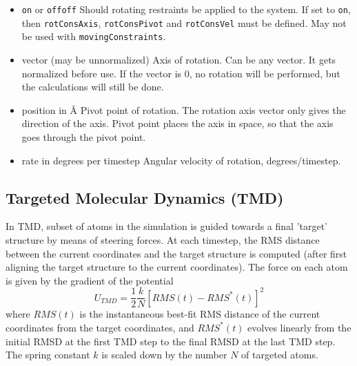 \begin{itemize}

\item
{}
{{\tt on} or {\tt off}}{{\tt off}}
{Should rotating restraints be applied to the system. If set
to {\tt on}, then {\tt rotConsAxis}, {\tt rotConsPivot} and
{\tt rotConsVel} must be defined.
May not be used with {\tt movingConstraints}.}

\item
{}
{vector (may be unnormalized)}
{Axis of rotation. Can be any vector. It gets
normalized before use. If the vector is 0,
no rotation will be performed, but the calculations
will still be done.}

\item
{}
{position in \AA}
{Pivot point of rotation. The rotation axis vector
only gives the direction of the axis. Pivot point
places the axis in space, so that the axis goes
through the pivot point.}

\item
{}
{rate in degrees per timestep}
{Angular velocity of rotation, degrees/timestep.}

\end{itemize}

\subsection{Targeted Molecular Dynamics (TMD)}

In TMD, subset of atoms in the simulation is guided towards a 
final 'target' structure by means of steering forces.  At each timestep, 
the RMS distance between
the current coordinates and the target structure is computed (after
first aligning the target structure to the current coordinates).
The force on each atom is given by the gradient of the potential
\begin{equation}
U_{TMD} = \frac{1}{2} \frac{k}{N} \left[ RMS(t) - RMS^*(t) \right]^2
\label{eq:tmdpotential}
\end{equation}
where $RMS(t)$ is the instantaneous best-fit RMS distance of the current
coordinates from the target coordinates, and $RMS^*(t)$ evolves linearly
from the initial RMSD at the first TMD step to the final RMSD at the last 
TMD step.  The spring constant $k$ is scaled down by the number $N$ of targeted
atoms.  

